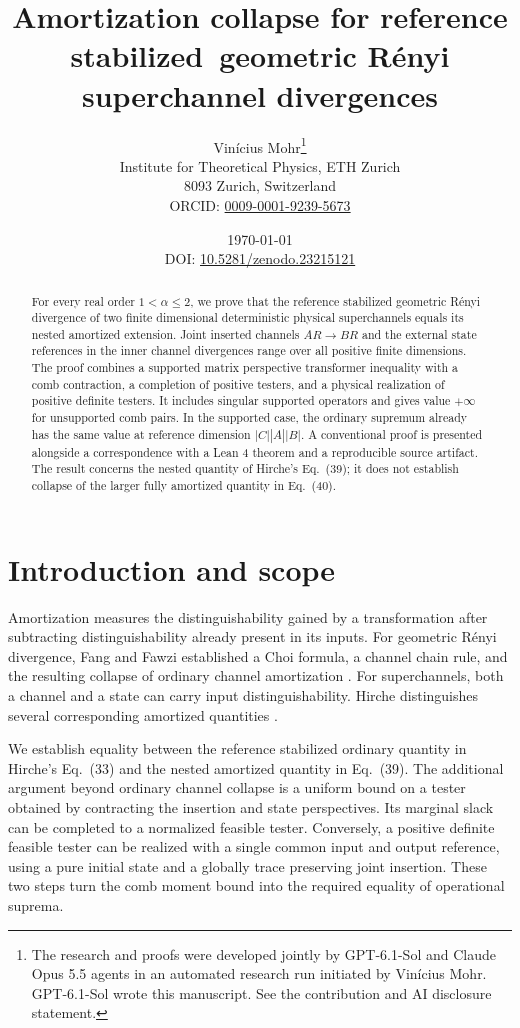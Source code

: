 \documentclass[11pt]{article}
\title{Amortization collapse for reference stabilized\ geometric R\'enyi superchannel divergences}
\author{Vin\'icius Mohr\thanks{The research and proofs were developed jointly by GPT-6.1-Sol and Claude Opus 5.5 agents in an automated research run initiated by Vin\'icius Mohr. GPT-6.1-Sol wrote this manuscript. See the contribution and AI disclosure statement.}\\[0.5em]
  \small Institute for Theoretical Physics, ETH Zurich\\
  \small 8093 Zurich, Switzerland\\[0.3em]
  \small ORCID: \href{https://orcid.org/0009-0001-9239-5673}{0009-0001-9239-5673}}
\date{\today\\[0.4em]{\small DOI: \href{https://doi.org/10.5281/zenodo.23215121}{10.5281/zenodo.23215121}}}
\theoremstyle{remark}
\begin{document}
\maketitle
\begin{abstract}
For every real order $1<\alpha\leq2$, we prove that the reference stabilized
geometric R\'enyi divergence of two finite dimensional deterministic physical
superchannels equals its nested amortized extension. Joint inserted channels
$AR\to BR$ and the external state references in the inner channel divergences
range over all positive finite dimensions. The proof combines a supported
matrix perspective transformer inequality with a comb contraction, a completion
of positive testers, and a physical realization of positive definite testers.
It includes singular supported operators and gives value $+\infty$ for
unsupported comb pairs. In the supported case, the ordinary supremum already
has the same value at reference dimension $|C||A||B|$. A conventional proof is
presented alongside a correspondence with a Lean 4 theorem and a reproducible
source artifact. The result concerns the nested quantity of Hirche's
Eq.~(39); it does not establish collapse of the larger fully amortized
quantity in Eq.~(40).
\end{abstract}

\section{Introduction and scope}
Amortization measures the distinguishability gained by a transformation after
subtracting distinguishability already present in its inputs. For geometric
R\'enyi divergence, Fang and Fawzi established a Choi formula, a channel chain
rule, and the resulting collapse of ordinary channel amortization
\cite[Lemmas~5--7]{FF21}. For superchannels, both a channel and a state can
carry input distinguishability. Hirche distinguishes several corresponding
amortized quantities \cite[Definitions~4.4--4.5]{Hir23}.

We establish equality between the reference stabilized ordinary quantity in
Hirche's Eq.~(33) and the nested amortized quantity in Eq.~(39). The additional
argument beyond ordinary channel collapse is a uniform bound on a tester
obtained by contracting the insertion and state perspectives. Its marginal
slack can be completed to a normalized feasible tester. Conversely, a positive
definite feasible tester can be realized with a single common input and output
reference, using a pure initial state and a globally trace preserving joint
insertion. These two steps turn the comb moment bound into the required
equality of operational suprema.
\end{document}
